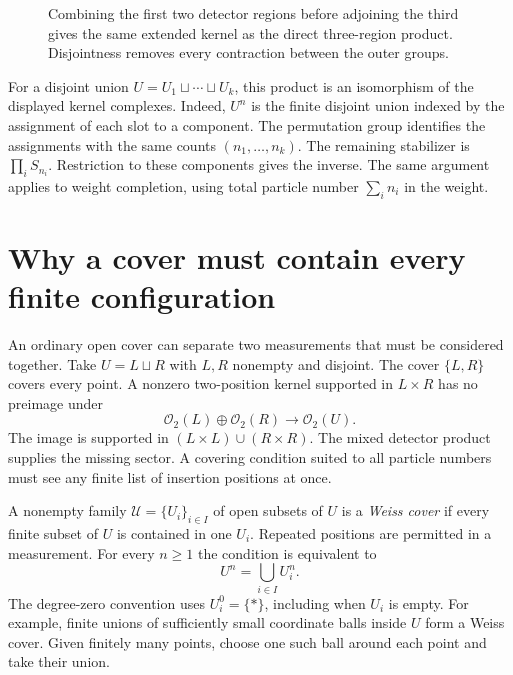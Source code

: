 \begin{figure}[htbp]
\centering
{}
\caption{Combining the first two detector regions before adjoining the
third gives the same extended kernel as the direct three-region product.
Disjointness removes every contraction between the outer groups.}
\label{fig:clo-nesting}
\end{figure}

For a disjoint union $U=U_1\sqcup\cdots\sqcup U_k$, this product
is an isomorphism of the displayed kernel complexes.
Indeed, $U^n$ is the finite disjoint union indexed by the assignment
of each slot to a component. The permutation group identifies the
assignments with the same counts $(n_1,\ldots,n_k)$.
The remaining stabilizer is $\prod_iS_{n_i}$.
Restriction to these components gives the inverse.
The same argument applies to weight completion, using total particle
number $\sum_i n_i$ in the weight.

\section{Why a cover must contain every finite configuration}
\label{sec:clo-cover}

An ordinary open cover can separate two measurements that must be
considered together. Take $U=L\sqcup R$ with $L,R$ nonempty and
disjoint. The cover $\{L,R\}$ covers every point.
A nonzero two-position kernel supported in $L\times R$ has no
preimage under
\[
 \mathscr O_2(L)\oplus\mathscr O_2(R)\longrightarrow\mathscr O_2(U).
\]
The image is supported in $(L\times L)\cup(R\times R)$.
The mixed detector product supplies the missing sector.
A covering condition suited to all particle numbers must see any finite
list of insertion positions at once.

A nonempty family $\mathcal U=\{U_i\}_{i\in I}$ of open subsets of
$U$ is a \emph{Weiss cover} if every finite subset of $U$ is contained
in one $U_i$. Repeated positions are permitted in a measurement.
For every $n\geq1$ the condition is equivalent to
\[
 U^n=\bigcup_{i\in I}U_i^n.
\]
The degree-zero convention uses $U_i^0=\{\ast\}$, including when
$U_i$ is empty.
For example, finite unions of sufficiently small coordinate balls inside
$U$ form a Weiss cover. Given finitely many points, choose one such ball
around each point and take their union.

